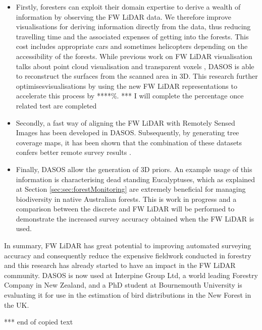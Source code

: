 \documentclass{subfiles}
\begin{document}
\begin{itemize}
\item Firstly, foresters can exploit their domain expertise to derive a wealth of information by observing the FW LiDAR data. We therefore improve visualisations for deriving information directly from the data, thus reducing travelling time and the associated expenses of getting into the forests. This cost includes appropriate cars and sometimes helicopters depending on the accessibility of the forests. While previous work on FW LiDAR visualisation talks about point cloud visualisation \cite{Isenburg2012Pulsewaves} and transparent voxels \cite{Persson2005}, DASOS is able to reconstruct the surfaces from the scanned area in 3D. This research further optimisesvisualisations by using the new FW LiDAR representations to accelerate this process by ****\%. {\color{red} *** I will complete the percentage once related test are completed}

\item Secondly, a fast way of aligning the FW LiDAR with Remotely Sensed Images has been developed in DASOS. Subsequently, by generating tree coverage maps, it has been shown that the combination of these datasets confers better remote survey results \cite{Miltiadou2015}.


\item {\color{gray} Finally, DASOS allow the generation of 3D priors. An example usage of this information is characterising dead standing Eucalyptuses, which as explained at Section \ref{sec:sec:forestMonitoring} are extremely beneficial for managing biodiversity in native Australian forests. This is work in progress and a comparison between the discrete and FW LiDAR will be performed to demonstrate the increased survey accuracy obtained when the FW LiDAR is used.}

\end{itemize}



\par In summary, FW LiDAR has great potential to improving automated surveying accuracy and consequently reduce the expensive fieldwork conducted in forestry and this research has already started to have an impact in the FW LiDAR community. DASOS is now used at Interpine Group Ltd, a world leading Forestry Company in New Zealand, and a PhD student at Bournemouth University is evaluating it for use in the estimation of bird distributions in the New Forest in the UK.

	
	\par {\color{red} *** end of copied text}
	
\end{document}
